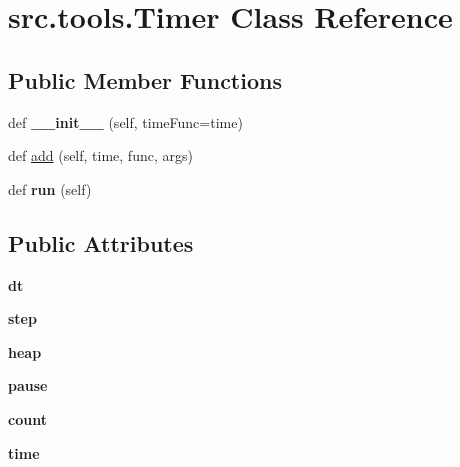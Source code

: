 \hypertarget{classsrc_1_1tools_1_1_timer}{}\section{src.\+tools.\+Timer Class Reference}
\label{classsrc_1_1tools_1_1_timer}
\subsection*{Public Member Functions}
\begin{DoxyCompactItemize}
\item 
\hypertarget{classsrc_1_1tools_1_1_timer_a728bb045eaf7cbf58e8b1c332febb474}{}\label{classsrc_1_1tools_1_1_timer_a728bb045eaf7cbf58e8b1c332febb474} 
def {\bfseries \+\_\+\+\_\+init\+\_\+\+\_\+} (self, time\+Func=time)
\item 
def \hyperlink{classsrc_1_1tools_1_1_timer_a9aed0346c5a6131bb4cc02821f11ad73}{add} (self, time, func, args)
\item 
\hypertarget{classsrc_1_1tools_1_1_timer_a8ee9a8b99ee0a07c6ba3abea81256f0e}{}\label{classsrc_1_1tools_1_1_timer_a8ee9a8b99ee0a07c6ba3abea81256f0e} 
def {\bfseries run} (self)
\end{DoxyCompactItemize}
\subsection*{Public Attributes}
\begin{DoxyCompactItemize}
\item 
\hypertarget{classsrc_1_1tools_1_1_timer_a350e9e0548e5b28198dd3c1a4e7f03dc}{}\label{classsrc_1_1tools_1_1_timer_a350e9e0548e5b28198dd3c1a4e7f03dc} 
{\bfseries dt}
\item 
\hypertarget{classsrc_1_1tools_1_1_timer_a20a7f3faab76ac0e0668d9dcb3ccbef0}{}\label{classsrc_1_1tools_1_1_timer_a20a7f3faab76ac0e0668d9dcb3ccbef0} 
{\bfseries step}
\item 
\hypertarget{classsrc_1_1tools_1_1_timer_aca5fc0fd4c4e48f152c44a7412329dd5}{}\label{classsrc_1_1tools_1_1_timer_aca5fc0fd4c4e48f152c44a7412329dd5} 
{\bfseries heap}
\item 
\hypertarget{classsrc_1_1tools_1_1_timer_afc0baeda820a2c7c90cc0997cefbd8e6}{}\label{classsrc_1_1tools_1_1_timer_afc0baeda820a2c7c90cc0997cefbd8e6} 
{\bfseries pause}
\item 
\hypertarget{classsrc_1_1tools_1_1_timer_aa03005bc66f5e7ef870e3f016be07111}{}\label{classsrc_1_1tools_1_1_timer_aa03005bc66f5e7ef870e3f016be07111} 
{\bfseries count}
\item 
\hypertarget{classsrc_1_1tools_1_1_timer_adf4d5c3f24b07c38d18ef5470af52d93}{}\label{classsrc_1_1tools_1_1_timer_adf4d5c3f24b07c38d18ef5470af52d93} 
{\bfseries time}
\end{DoxyCompactItemize}


